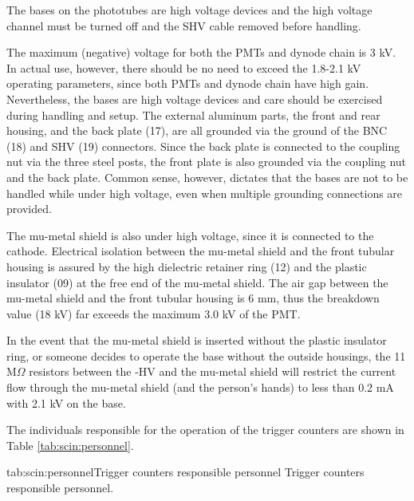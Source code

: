\begin{safetyen}{10}{10}
  The bases on the phototubes are high voltage devices and the high voltage channel must be
  turned off and the SHV cable removed before handling.
  
  The maximum (negative) voltage for both the PMTs and dynode chain is 3 kV. In actual 
  use, however, there should be no need to exceed the 1.8-2.1 kV operating 
  parameters, since both PMTs and dynode chain have high gain. Nevertheless, the 
  bases are high voltage devices and care should be exercised during handling and 
  setup. The external aluminum parts, the front and rear housing, and the back 
  plate (17), are all grounded via the ground of the BNC (18) and SHV (19) 
  connectors. Since the back plate is connected to the coupling nut via the three 
  steel posts, the front plate is also grounded via the coupling nut and the back 
  plate. Common sense, however, dictates that the bases are not to be handled     
  while under high voltage, even when multiple grounding connections are provided.
  
  The mu-metal shield is also under high voltage, since it is connected to the 
  cathode. Electrical isolation between the mu-metal shield and the front 
  tubular housing is assured by the high dielectric retainer ring (12) and the 
  plastic insulator (09) at the free end of the mu-metal shield. The air gap 
  between the mu-metal shield and the front tubular housing is 6 mm, thus the 
  breakdown value (18 kV) far exceeds the maximum 3.0 kV of the PMT.
  
  In the event that the mu-metal shield is inserted without the plastic insulator 
  ring, or someone decides to operate the base without the outside housings, the 
  11 M$\Omega$ resistors between the -HV and the mu-metal shield will restrict the 
  current flow through the mu-metal shield (and the person's hands) to less than 0.2 
  mA with 2.1 kV on the base. 
\end{safetyen}


The individuals responsible for the operation 
of the trigger counters are shown in Table \ref{tab:scin:personnel}.

\begin{namestab}{tab:scin:personnel}{Trigger counters responsible personnel} {%
      Trigger counters responsible personnel.}
  \JackSegal{}
\end{namestab}

